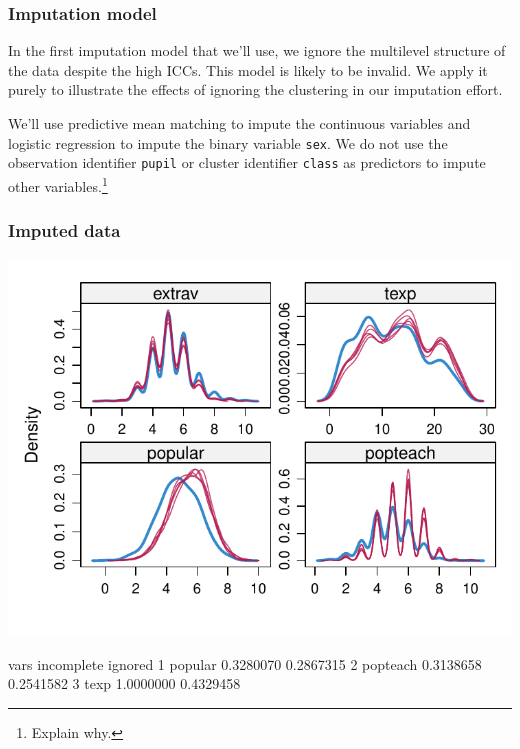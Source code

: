 \documentclass[
]{jss}
\begin{document}
\hypertarget{imputation-model}{%
\subsubsection{Imputation model}\label{imputation-model}}

In the first imputation model that we'll use, we ignore the multilevel
structure of the data despite the high ICCs. This model is likely to be
invalid. We apply it purely to illustrate the effects of ignoring the
clustering in our imputation effort.

We'll use predictive mean matching to impute the continuous variables
and logistic regression to impute the binary variable \texttt{sex}. We
do not use the observation identifier \texttt{pupil} or cluster
identifier \texttt{class} as predictors to impute other
variables.\footnote{Explain why.}

\begin{CodeChunk}
\end{CodeChunk}

\hypertarget{imputed-data}{%
\subsubsection{Imputed data}\label{imputed-data}}

\begin{CodeChunk}


\begin{center}\includegraphics{Manuscript_files/figure-latex/pop_ignored_eval-1} \end{center}

\begin{CodeOutput}
      vars incomplete   ignored
1  popular  0.3280070 0.2867315
2 popteach  0.3138658 0.2541582
3     texp  1.0000000 0.4329458
\end{CodeOutput}
\end{CodeChunk}
\end{document}
